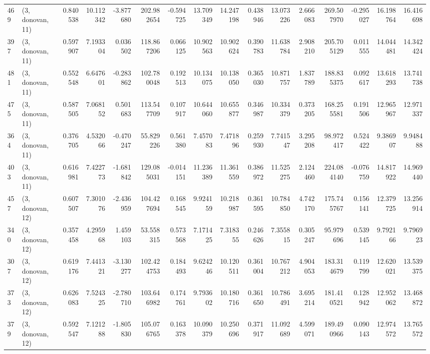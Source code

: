 \begin{tabular}{llrrrrrrrrrrrrrr}
469 &  (3, donovan, 11) &   0.840538 &  10.112342 &  -3.877680 &   202.982654 &  -0.594725 &  13.709349 &  14.247198 &  0.438946 &  13.073226 &   2.666083 &   269.507970 & -0.295027 &  16.198764 &  16.416698 \\
397 &  (3, donovan, 11) &   0.597907 &   7.193304 &   0.036502 &   118.867206 &   0.066125 &  10.902563 &  10.902624 &  0.390783 &  11.638784 &   2.908210 &   205.705129 &  0.011555 &  14.044481 &  14.342424 \\
481 &  (3, donovan, 11) &   0.552548 &   6.647601 &  -0.283862 &   102.780048 &   0.192513 &  10.134075 &  10.138050 &  0.365030 &  10.871757 &   1.837789 &   188.835375 &  0.092617 &  13.618293 &  13.741738 \\
475 &  (3, donovan, 11) &   0.587505 &   7.068152 &   0.501683 &   113.547709 &   0.107917 &  10.644060 &  10.655877 &  0.346987 &  10.334379 &   0.373205 &   168.255581 &  0.191506 &  12.965967 &  12.971337 \\
364 &  (3, donovan, 11) &   0.376705 &   4.532066 &  -0.470247 &    55.829226 &   0.561380 &   7.457083 &   7.471896 &  0.259930 &   7.741547 &   3.295208 &    98.972417 &  0.524422 &   9.386907 &   9.948488 \\
403 &  (3, donovan, 11) &   0.616981 &   7.422773 &  -1.681842 &   129.085031 &  -0.014151 &  11.236389 &  11.361559 &  0.386972 &  11.525275 &   2.124460 &   224.084140 & -0.076759 &  14.817922 &  14.969440 \\
457 &  (3, donovan, 12) &   0.607507 &   7.301076 &  -2.436959 &   104.427694 &   0.168545 &   9.924159 &  10.218987 &  0.361595 &  10.784850 &   4.742170 &   175.745767 &  0.156141 &  12.379725 &  13.256914 \\
340 &  (3, donovan, 12) &   0.357458 &   4.295968 &   1.459103 &    53.558315 &   0.573568 &   7.171425 &   7.318355 &  0.246626 &   7.355815 &   0.305247 &    95.979696 &  0.539145 &   9.792166 &   9.796923 \\
307 &  (3, donovan, 12) &   0.619176 &   7.441321 &  -3.130277 &   102.424753 &   0.184493 &   9.624246 &  10.120511 &  0.361004 &  10.767212 &   4.904053 &   183.314679 &  0.119799 &  12.620021 &  13.539375 \\
373 &  (3, donovan, 12) &   0.626083 &   7.524325 &  -2.780710 &   103.646982 &   0.174761 &   9.793602 &  10.180716 &  0.361650 &  10.786491 &   3.695214 &   181.410521 &  0.128942 &  12.952062 &  13.468872 \\
379 &  (3, donovan, 12) &   0.592547 &   7.121288 &  -1.805830 &   105.076765 &   0.163378 &  10.090379 &  10.250696 &  0.371917 &  11.092689 &   4.599071 &   189.490966 &  0.090143 &  12.974572 &  13.765572 \\

\end{tabular}
